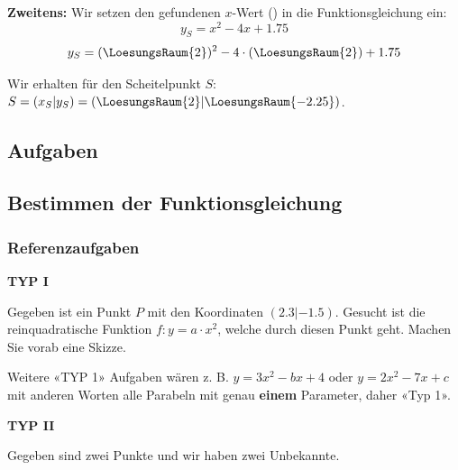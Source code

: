 
\textbf{Zweitens:} Wir setzen den gefundenen $x$-Wert
() in die Funktionsgleichung
ein:
$$y_S = x^2 - 4x + 1.75$$
$$y_S = (\LoesungsRaum{2})^2 - 4\cdot{}(\LoesungsRaum{2}) + 1.75$$

Wir erhalten für den Scheitelpunkt $S$: $S=(x_S | y_S) = (\LoesungsRaum{2} | \LoesungsRaum{-2.25})$.

  
\subsection*{Aufgaben}

\newpage

\subsection{Bestimmen der Funktionsgleichung}

\subsubsection{Referenzaufgaben}

\textbf{TYP I}

Gegeben ist ein Punkt $P$ mit den Koordinaten $(2.3 | -1.5)$. Gesucht ist die reinquadratische Funktion $f: y=a\cdot{}x^2$, welche durch diesen Punkt geht.
Machen Sie vorab eine Skizze.




Weitere «TYP 1» Aufgaben wären z. B. $y = 3x^2 - bx + 4$ oder $y=2x^2
-7x + c$ mit anderen Worten alle Parabeln mit genau \textbf{einem}
Parameter, daher «Typ 1».

\newpage



\textbf{TYP II}

Gegeben sind zwei Punkte und wir haben zwei Unbekannte.

